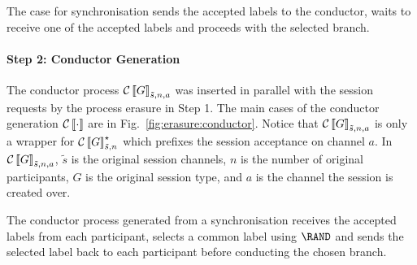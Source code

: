 The case for synchronisation sends the accepted labels to the conductor, waits
to receive one of the accepted labels and proceeds with the selected branch.




\paragraph{Step 2: Conductor Generation} The conductor process $\mathcal{C}\left\llbracket G \right\rrbracket_{\tilde s,n,a}$ was inserted in
parallel with the session requests by the process erasure in Step 1.
The main cases of the conductor generation $\mathcal{C}\left\llbracket \cdot \right\rrbracket$ are in
Fig.~\ref{fig:erasure:conductor}.
Notice that $\mathcal{C}\left\llbracket G \right\rrbracket_{\tilde s,n,a}$ is only a wrapper for
$\mathcal{C}\left\llbracket G \right\rrbracket^\star_{\tilde s,n}$ which prefixes the session
acceptance on channel $a$.  In $\mathcal{C}\left\llbracket G \right\rrbracket_{\tilde s,n,a}$,
$\tilde s$ is the original session channels, $n$ is the
number of original participants, $G$ is the original session type, and $a$ is
the channel the session is created over.

The conductor process generated from a synchronisation receives the accepted
labels from each participant, selects a common label using $\RAND$ and sends
the selected label back to each participant before conducting the chosen
branch.


